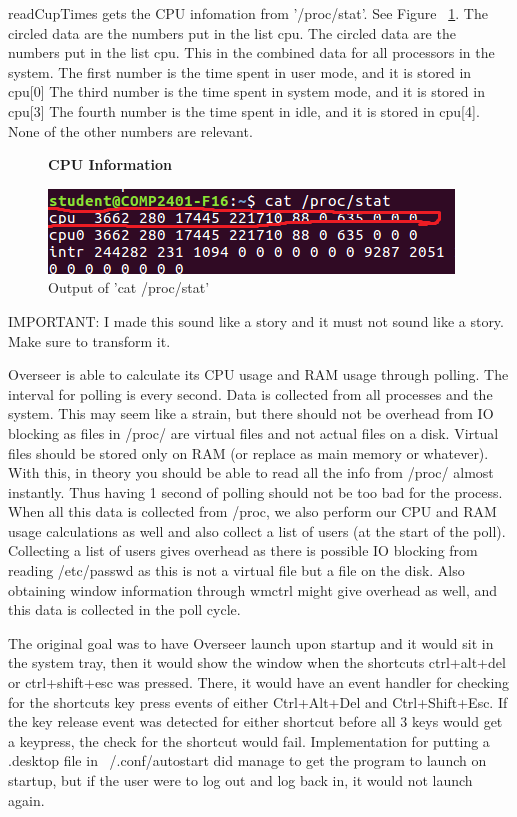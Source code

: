\documentclass[12pt]{article}
\begin{document}
readCupTimes gets the CPU infomation from '/proc/stat'.
See Figure ~\ref{figCPUInfo}.
The circled data are the numbers put in the list cpu.
The circled data are the numbers put in the list cpu.
This in the combined data for all processors in the system.
The first number is the time spent in user mode, and it is stored in cpu[0]
The third number is the time spent in system mode, and it is stored in cpu[3]
The fourth number is the time spent in idle, and it is stored in cpu[4].
None of the other numbers are relevant.
\begin{figure}[h]
	\centering
	\textbf{CPU Information}\par\medskip
	\includegraphics{totalCPU}
	\caption{Output of 'cat /proc/stat'}
	\label{figCPUInfo}
\end{figure}

IMPORTANT: I made this sound like a story and it must not sound like a story. Make sure to transform it.

Overseer is able to calculate its CPU usage and RAM usage through polling.
The interval for polling is every second.
Data is collected from all processes and the system.
This may seem like a strain, but there should not be overhead from IO blocking as files in /proc/ are virtual files and not actual files on a disk. Virtual files should be stored only on RAM (or replace as main memory or whatever).
With this, in theory you should be able to read all the info from /proc/ almost instantly.
Thus having 1 second of polling should not be too bad for the process.
When all this data is collected from /proc, we also perform our CPU and RAM usage calculations as well and also collect a list of users (at the start of the poll).
Collecting a list of users gives overhead as there is possible IO blocking from reading /etc/passwd as this is not a virtual file but a file on the disk.
Also obtaining window information through wmctrl might give overhead as well, and this data is collected in the poll cycle.

The original goal was to have Overseer launch upon startup and it would sit in the system tray, then it would show the window when the shortcuts ctrl+alt+del or ctrl+shift+esc was pressed.
There, it would have an event handler for checking for the shortcuts key press events of either Ctrl+Alt+Del and Ctrl+Shift+Esc.
If the key release event was detected for either shortcut before all 3 keys would get a keypress, the check for the shortcut would fail.
Implementation for putting a .desktop file in ~/.conf/autostart did manage to get the program to launch on startup, but if the user were to log out and log back in, it would not launch again.
\end{document}
